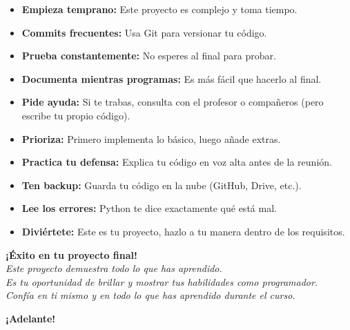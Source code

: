 \documentclass[12pt,a4paper]{article}
\begin{document}
\begin{itemize}[leftmargin=*]
    \item \textbf{Empieza temprano:} Este proyecto es complejo y toma tiempo.
    
    \item \textbf{Commits frecuentes:} Usa Git para versionar tu código.
    
    \item \textbf{Prueba constantemente:} No esperes al final para probar.
    
    \item \textbf{Documenta mientras programas:} Es más fácil que hacerlo al final.
    
    \item \textbf{Pide ayuda:} Si te trabas, consulta con el profesor o compañeros (pero escribe tu propio código).
    
    \item \textbf{Prioriza:} Primero implementa lo básico, luego añade extras.
    
    \item \textbf{Practica tu defensa:} Explica tu código en voz alta antes de la reunión.
    
    \item \textbf{Ten backup:} Guarda tu código en la nube (GitHub, Drive, etc.).
    
    \item \textbf{Lee los errores:} Python te dice exactamente qué está mal.
    
    \item \textbf{Diviértete:} Este es tu proyecto, hazlo a tu manera dentro de los requisitos.
\end{itemize}

\vspace{1cm}

\begin{center}
\textbf{¡Éxito en tu proyecto final!}\\
\vspace{0.5cm}
\textit{Este proyecto demuestra todo lo que has aprendido.\\
Es tu oportunidad de brillar y mostrar tus habilidades como programador.\\
Confía en ti mismo y en todo lo que has aprendido durante el curso.}
\vspace{0.5cm}

\Large{\textbf{¡Adelante!}}
\end{center}
\end{document}
